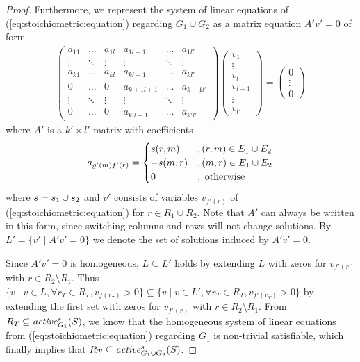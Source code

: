 \begin{proof}
Furthermore, we represent the system of linear equations of (\ref{eq:stoichiometric:equation}) regarding $G_1\cup G_2$ as a matrix equation $A'v'=0$ of form
\begin{align*}
\begin{pmatrix}
a_{11} & \dots & a_{1l} & a_{1l+1} & \dots & a_{1l'} \\
\vdots & \ddots& \vdots & \vdots   & \ddots& \vdots \\
a_{k1} & \dots & a_{kl} & a_{kl+1} & \dots & a_{kl'} \\
0      & \dots & 0      & a_{k+1l+1} & \dots & a_{k+1l'} \\
\vdots & \ddots& \vdots & \vdots   & \ddots& \vdots \\
0      & \dots & 0      & a_{k'l+1}& \dots & a_{k'l'}
\end{pmatrix}
\begin{pmatrix}
v_1 \\
\vdots  \\
v_l \\
v_{l+1} \\
\vdots \\
v_{l'}
\end{pmatrix}
=
\begin{pmatrix}
0 \\
\vdots \\
0
\end{pmatrix}%
\end{align*}
where $A'$ is a $k'\times l'$ matrix with coefficients
\begin{align*}
a_{g'(m)f'(r)}=
    \begin{cases}
    s(r,m)  &, (r,m)\in E_1\cup E_2 \\
    -s(m,r) &, (m,r)\in E_1\cup E_2 \\
    0       &, \text{ otherwise}
    \end{cases}
\end{align*}
where $s=s_1\cup s_2$
and $v'$ consists of variables $v_{f'(r)}$ of (\ref{eq:stoichiometric:equation}) for $r\in R_1\cup R_2$.
Note that $A'$ can always be written in this form, since switching columns and rows will not change solutions.
By $L'=\{v'\mid A'v'=0\}$ we denote the set of solutions induced by $A'v'=0$.

Since $A'v'=0$ is homogeneous, $L\subseteq L'$ holds by extending $L$ with zeros for $v_{f'(r)}$ with $r\in R_2\setminus R_1$.
Thus $\{v\mid v\in L, \forall r_T\in R_T, v_{f(r_T)}>0\}
\subseteq\{v\mid v\in L', \forall r_T\in R_T, v_{f'(r_T)}>0\}$
by extending the first set with zeros for $v_{f'(r)}$ with $r\in R_2\setminus R_1$.
From $R_T\subseteq\mathit{active}^{s}_{G_1}(S)$, we know that the homogeneous system of linear equations from
(\ref{eq:stoichiometric:equation}) regarding $G_1$ is non-trivial satisfiable,
which finally implies that $R_T\subseteq\mathit{active}^{s}_{G_1\cup G_2}(S)$.
\end{proof}


